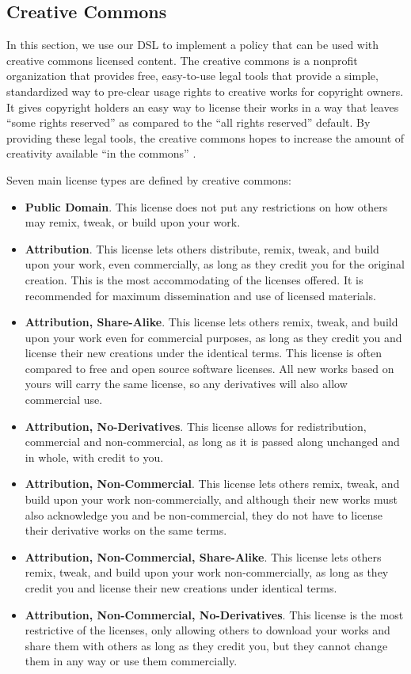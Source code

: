 \subsection{Creative Commons}\label{sec:model-cc}
In this section, we use our DSL to implement a policy that can be used with creative commons licensed content.  The creative commons is a nonprofit organization that provides free, easy-to-use legal tools that provide a simple, standardized way to pre-clear usage rights to creative works for copyright owners.  It gives copyright holders an easy way to license their works in a way that leaves ``some rights reserved'' as compared to the ``all rights reserved'' default.  By providing these legal tools, the creative commons hopes to increase the amount of creativity available ``in the commons'' \cite{creative-commons}.

Seven main license types are defined by creative commons:

\begin{itemize}
\item \textbf{Public Domain}. This license does not put any restrictions on how others may remix, tweak, or build upon your work.
\item \textbf{Attribution}.  This license lets others distribute, remix, tweak, and build upon your work, even commercially, as long as they credit you for the original creation. This is the most accommodating of the licenses offered.  It is recommended for maximum dissemination and use of licensed materials.
\item \textbf{Attribution, Share-Alike}.  This license lets others remix, tweak, and build upon your work even for commercial purposes, as long as they credit you and license their new creations under the identical terms.  This license is often compared to free and open source software licenses.  All new works based on yours will carry the same license, so any derivatives will also allow commercial use.
\item \textbf{Attribution, No-Derivatives}.  This license allows for redistribution, commercial and non-commercial, as long as it is passed along unchanged and in whole, with credit to you.
\item \textbf{Attribution, Non-Commercial}.  This license lets others remix, tweak, and build upon your work non-commercially, and although their new works must also acknowledge you and be non-commercial, they do not have to license their derivative works on the same terms.
\item \textbf{Attribution, Non-Commercial, Share-Alike}.  This license lets others remix, tweak, and build upon your work non-commercially, as long as they credit you and license their new creations under identical terms.
\item \textbf{Attribution, Non-Commercial, No-Derivatives}.  This license is the most restrictive of the licenses, only allowing others to download your works and share them with others as long as they credit you, but they cannot change them in any way or use them commercially.
\end{itemize}

